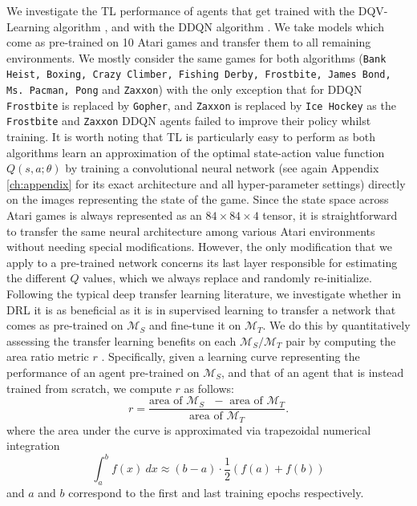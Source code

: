 We investigate the TL performance of agents that get trained with the DQV-Learning algorithm \citep{sabatelli2018deep}, and with the DDQN algorithm \citep{van2016deep}. We take models which come as pre-trained on 10 Atari games and transfer them to all remaining environments. We mostly consider the same games for both algorithms (\texttt{Bank Heist, Boxing, Crazy Climber, Fishing Derby, Frostbite, James Bond, Ms. Pacman, Pong} and \texttt{Zaxxon}) with the only exception that for DDQN \texttt{Frostbite} is replaced by \texttt{Gopher}, and \texttt{Zaxxon} is replaced by \texttt{Ice Hockey} as the \texttt{Frostbite} and \texttt{Zaxxon} DDQN agents failed to improve their policy whilst training. It is worth noting that TL is particularly easy to perform as both algorithms learn an approximation of the optimal state-action value function $Q(s,a;\theta)$ by training a convolutional neural network (see again Appendix \ref{ch:appendix} for its exact architecture and all hyper-parameter settings) directly on the images representing the state of the game. Since the state space across Atari games is always represented as an $84\times84\times4$ tensor, it is straightforward to transfer the same neural architecture among various Atari environments without needing special modifications. However, the only modification that we apply to a pre-trained network concerns its last layer responsible for estimating the different $Q$ values, which we always replace and randomly re-initialize. Following the typical deep transfer learning literature, we investigate whether in DRL it is as beneficial as it is in supervised learning to transfer a network that comes as pre-trained on $\mathcal{M}_S$ and fine-tune it on $\mathcal{M}_T$. We do this by quantitatively assessing the transfer learning benefits on each $\mathcal{M}_S/\mathcal{M}_T$ pair by computing the area ratio metric $r$ \citep{taylor2009transfer}. Specifically, given a learning curve representing the performance of an agent pre-trained on $\mathcal{M}_S$, and that of an agent that is instead trained from scratch, we compute $r$ as follows:
\begin{equation}
	r = \frac{\text{area of $\mathcal{M}_S$ $-$ area of $\mathcal{M}_T$}}{\text{area of $\mathcal{M}_T$}}.
\label{eq:area_ratio_metric}
\end{equation}
where the area under the curve is approximated via trapezoidal numerical integration
\begin{equation}
	\int^{b}_{a}f(x)\:dx \approx(b-a) \cdot \frac{1}{2}(f(a)+f(b))
\end{equation}
and $a$ and $b$ correspond to the first and last training epochs respectively.

